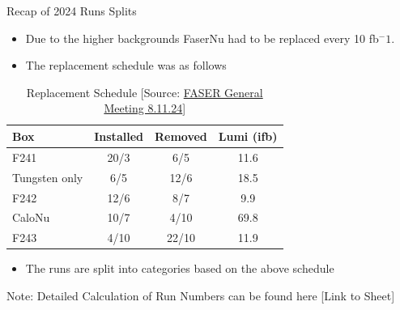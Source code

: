 \begin{frame}{Recap of 2024 Runs Splits}
    \begin{itemize}
        \item Due to the higher backgrounds FaserNu had to be replaced every 10 fb$^-1$.
        \item The replacement schedule was as follows
    \end{itemize}
    \begin{table}[h!]
        \begin{tabular}{|l|c|c|c|}
            \hline
            \textbf{Box}  & \textbf{Installed} & \textbf{Removed} & \textbf{Lumi (ifb)} \\ \hline
            F241          & 20/3               & 6/5              & 11.6                \\ \hline
            Tungsten only & 6/5                & 12/6             & 18.5                \\ \hline
            F242          & 12/6               & 8/7              & 9.9                 \\ \hline
            CaloNu        & 10/7               & 4/10             & 69.8                \\ \hline
            F243          & 4/10               & 22/10            & 11.9                \\ \hline
        \end{tabular}
        \caption{Replacement Schedule [Source: \href{https://indico.cern.ch/event/1350805/contributions/5686417/attachments/2963344/5212652/FASER-GeneralMtg-8.11.24.pdf}{FASER General Meeting 8.11.24}]}
    \end{table}
	\vspace{-0.5cm}
    \begin{itemize}
        \item The runs are split into categories based on the above schedule
    \end{itemize}
    \scriptsize{Note: Detailed Calculation of Run Numbers can be found here [Link to Sheet]}
\end{frame}

